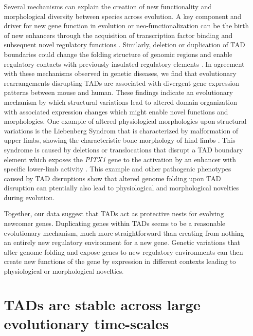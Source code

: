 \documentclass[a4paper,twoside=true,openright,parskip=full,chapterprefix=true,11pt,headings=normal,bibliography=totoc,listof=totoc,titlepage=on,captions=tableabove,draft=false]{scrreprt}
\theoremstyle{definition}
\theoremstyle{definition}
\theoremstyle{definition}
\theoremstyle{remark}
\begin{document}
Several mechanisms can explain the creation of new functionality and
morphological diversity between species across evolution. A key
component and driver for new gene function in evolution or
neo-functionalization can be the birth of new enhancers through the
acquisition of transcription factor binding and subsequent novel
regulatory functions \citep{Long2016}. Similarly, deletion or
duplication of TAD boundaries could change the folding structure of
genomic regions and enable regulatory contacts with previously insulated
regulatory elements \citep{Ibn-Salem2014, Lupianez2015, Franke2017}. In
agreement with these mechanisms observed in genetic diseases, we find
that evolutionary rearrangements disrupting TADs are associated with
divergent gene expression patterns between mouse and human. These
findings indicate an evolutionary mechanism by which structural
variations lead to altered domain organization with associated
expression changes which might enable novel functions and morphologies.
One example of altered physiological morphologies upon structural
variations is the Liebenberg Syndrom that is characterized by
malformation of upper limbs, showing the characteristic bone morphology
of hind-limbs \citep{Spielmann2012}. This syndrome is caused by
deletions or translocations that disrupt a TAD boundary element which
exposes the \emph{PITX1} gene to the activation by an enhancer with
specific lower-limb activity \citep{Spielmann2013a}. This example and
other pathogenic phenotypes caused by TAD disruptions
\citep{Lupianez2015, Franke2016, Flottmann2017} show that altered genome
folding upon TAD disruption can ptentially also lead to physiological
and morphological novelties during evolution.

Together, our data suggest that TADs act as protective nests for
evolving newcomer genes. Duplicating genes within TADs seems to be a
reasonable evolutionary mechanism, much more straightforward than
creating from nothing an entirely new regulatory environment for a new
gene. Genetic variations that alter genome folding and expose genes to
new regulatory environments can then create new functions of the gene by
expression in different contexts leading to physiological or
morphological novelties.

\hypertarget{tads-are-stable-across-large-evolutionary-time-scales}{%
\section{TADs are stable across large evolutionary
time-scales}\label{tads-are-stable-across-large-evolutionary-time-scales}}
\end{document}
